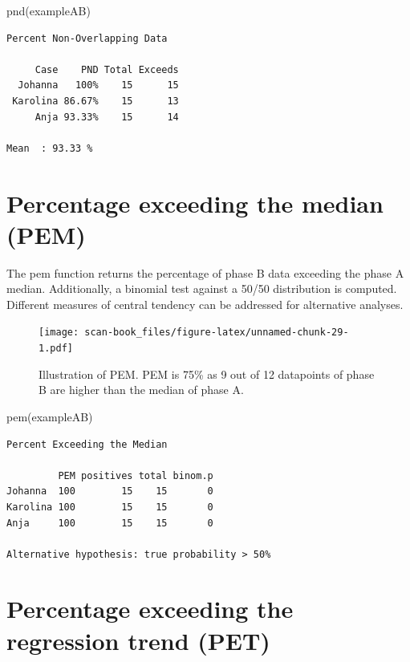 \documentclass[
]{book}
\newenvironment{Shaded}{\begin{snugshade}}{\end{snugshade}}
\newcommand{\FunctionTok}[1]{\textcolor[rgb]{0.00,0.00,0.00}{#1}}
\newcommand{\NormalTok}[1]{#1}
\begin{document}
\begin{Shaded}
\begin{Highlighting}[]
\FunctionTok{pnd}\NormalTok{(exampleAB)}
\end{Highlighting}
\end{Shaded}

\begin{verbatim}
Percent Non-Overlapping Data

     Case    PND Total Exceeds
  Johanna   100%    15      15
 Karolina 86.67%    15      13
     Anja 93.33%    15      14

Mean  : 93.33 %
\end{verbatim}

\hypertarget{percentage-exceeding-the-median-pem}{%
\section{Percentage exceeding the median (PEM)}\label{percentage-exceeding-the-median-pem}}

The pem function returns the percentage of phase B data exceeding the phase A median. Additionally, a binomial test against a 50/50 distribution is computed. Different measures of central tendency can be addressed for alternative analyses.

\begin{figure}
\centering
\texttt{[image: scan-book\_files/figure-latex/unnamed-chunk-29-1.pdf]}
\caption{\label{fig:unnamed-chunk-29}Illustration of PEM. PEM is 75\% as 9 out of 12 datapoints of phase B are higher than the median of phase A.}
\end{figure}

\begin{Shaded}
\begin{Highlighting}[]
\FunctionTok{pem}\NormalTok{(exampleAB)}
\end{Highlighting}
\end{Shaded}

\begin{verbatim}
Percent Exceeding the Median

         PEM positives total binom.p
Johanna  100        15    15       0
Karolina 100        15    15       0
Anja     100        15    15       0

Alternative hypothesis: true probability > 50%
\end{verbatim}

\hypertarget{percentage-exceeding-the-regression-trend-pet}{%
\section{Percentage exceeding the regression trend (PET)}\label{percentage-exceeding-the-regression-trend-pet}}
\end{document}
